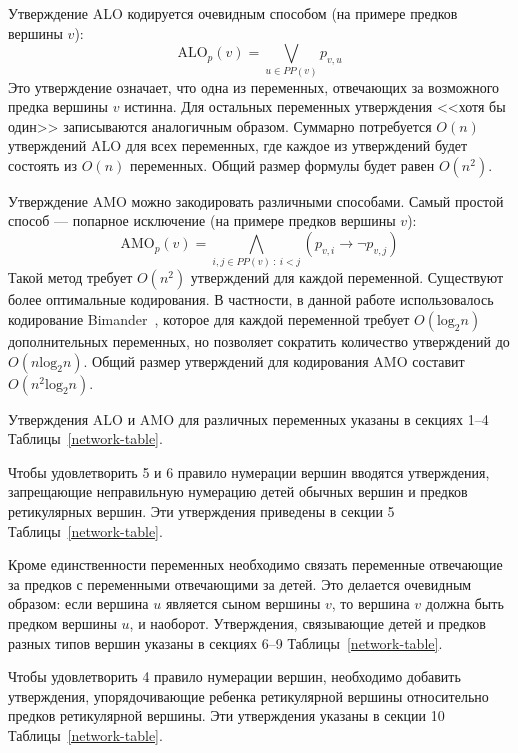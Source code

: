 Утверждение ALO кодируется очевидным способом (на примере предков вершины $v$):
$$\mathrm{ALO}_p(v) = \bigvee\limits_{u \in PP(v)} p_{v,u}$$
Это утверждение означает, что одна из переменных, отвечающих за возможного предка вершины $v$ истинна.
Для остальных переменных утверждения <<хотя бы один>> записываются аналогичным образом.
Суммарно потребуется $O(n)$ утверждений ALO для всех переменных, где каждое из утверждений будет состоять из $O(n)$ переменных.
Общий размер формулы будет равен $O(n^2)$.

Утверждение AMO можно закодировать различными способами.
Самый простой способ --- попарное исключение (на примере предков вершины $v$):
$$\mathrm{AMO}_p(v) = \bigwedge\limits_{i, j \in PP(v)~:~i < j} \left(p_{v,i} \rightarrow \neg p_{v,j}\right)$$
Такой метод требует $O(n^2)$ утверждений для каждой переменной. 
Существуют более оптимальные кодирования.
В частности, в данной работе использовалось кодирование Bimander~\cite{nguyenefficient}, которое для каждой переменной требует $O(\mathrm{log}_2 n)$ дополнительных переменных, но позволяет сократить количество утверждений до $O(n \mathrm{log}_2 n)$.
Общий размер утверждений для кодирования AMO составит $O(n^2 \mathrm{log}_2 n)$.

Утверждения ALO и AMO для различных переменных указаны в секциях 1--4 Таблицы~\ref{network-table}.

Чтобы удовлетворить 5 и 6 правило нумерации вершин вводятся утверждения, запрещающие неправильную нумерацию детей обычных вершин и предков ретикулярных вершин.
Эти утверждения приведены в секции 5 Таблицы~\ref{network-table}.

Кроме единственности переменных необходимо связать переменные отвечающие за предков с переменными отвечающими за детей.
Это делается очевидным образом: если вершина $u$ является сыном вершины $v$, то вершина $v$ должна быть предком вершины $u$, и наоборот.
Утверждения, связывающие детей и предков разных типов вершин указаны в секциях 6--9 Таблицы~\ref{network-table}.

Чтобы удовлетворить 4 правило нумерации вершин, необходимо добавить утверждения, упорядочивающие ребенка ретикулярной вершины относительно предков ретикулярной вершины.
Эти утверждения указаны в секции 10 Таблицы~\ref{network-table}.

